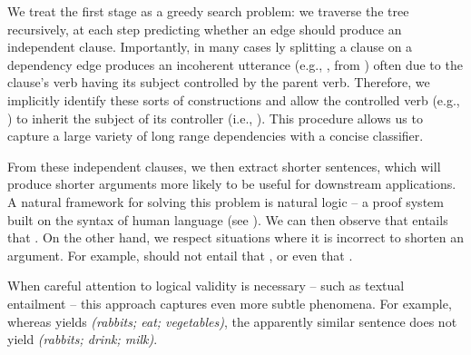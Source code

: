 We treat the first stage as a greedy search problem: we traverse
  the tree recursively, at each step predicting whether an edge should
  produce an independent clause.
Importantly, in many cases \naive ly splitting a clause on a dependency
  edge produces an incoherent utterance (e.g., ,
  from ) often due to the clause's verb having its subject 
  controlled by the parent verb.
Therefore, we implicitly identify these sorts of constructions
  and allow the controlled verb (e.g., ) to inherit the subject 
  of its controller (i.e., ).
This procedure allows us to capture a large variety of long range 
  dependencies with a concise classifier.
 
From these independent clauses, we then extract shorter sentences, which
  will produce shorter arguments more likely to be useful for downstream
  applications.
A natural framework for solving this problem is natural logic -- 
  a proof system built on the syntax of human language (see ).
We can then observe that
   entails
  that .
On the other hand, 
  we respect situations where it is incorrect to shorten an argument.
For example,  should not entail that
  , or even that .

When careful attention to logical validity is necessary -- such as 
  textual entailment -- this approach captures even more subtle phenomena.
For example, whereas  yields
  \textit{(rabbits; eat; vegetables)}, the apparently similar sentence
   does not yield
  \textit{(rabbits; drink; milk)}.

